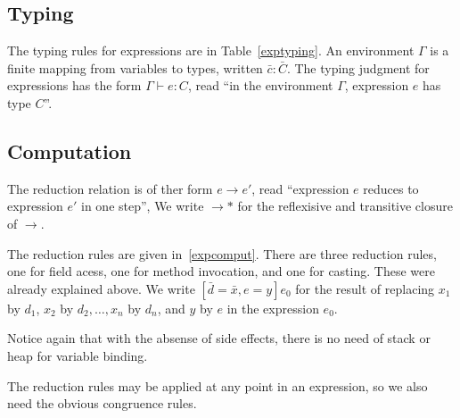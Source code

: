 \subsection{Typing}

The typing rules for expressions are in Table~\ref{exptyping}. An environment
$\Gamma$ is a finite mapping from variables to types, written $\bar{c}:\bar{C}$.
The typing judgment for expressions has the form $\Gamma \vdash e: C$, read ``in
the environment $\Gamma$, expression $e$ has type $C$''.

\subsection{Computation}
The reduction relation is of ther form $e \rightarrow e'$, read ``expression
$e$ reduces to expression $e'$ in one step'', We write $\rightarrow *$ for the
reflexisive and transitive closure of $\rightarrow$.

The reduction rules are given in~\ref{expcomput}. There are three reduction
rules, one for field acess, one for method invocation, and one for casting.
These were already explained above. We write $[\bar{d}=\bar{x}, e=y]e_0$ for
the result of replacing $x_1$ by $d_1$, $x_2$ by $d_2, \dots, x_n$ by $d_n$, and $y$ by $e$ in
the expression $e_0$.

Notice again that with the absense of side effects, there is no need of stack
or heap for variable binding. 

The reduction rules may be applied at any point in an expression, so we also
need the obvious congruence rules.

